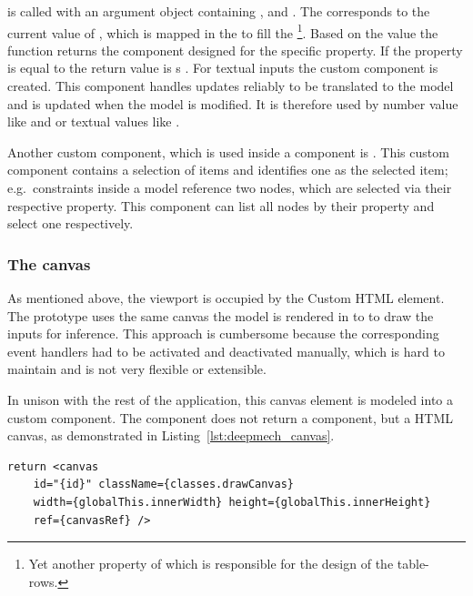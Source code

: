  is called with an argument object containing ,  and .
The  corresponds to the current value of , which is mapped in the  to fill the \footnote{Yet another property of  which is responsible for the design of the table-rows.}.
Based on the  value the  function returns the component designed for the specific property.
If the property is equal to  the return value is s .
For textual inputs the custom component  is created.
This component handles updates reliably to be translated to the  model and is updated when the  model is modified.
It is therefore used by number value like  and  or textual values like .

Another custom component, which is used inside a  component is .
This custom component contains a selection of items and identifies one as the selected item; e.g.\ constraints inside a  model reference two nodes, which are selected via their respective  property.
This component can list all nodes by their  property and select one respectively.

\subsubsection{The canvas}

As mentioned above, the viewport is occupied by the  Custom HTML element.
The prototype uses the same canvas the model is rendered in to to draw the inputs for inference.
This approach is cumbersome because the corresponding event handlers had to be activated and deactivated manually, which is hard to maintain and is not very flexible or extensible.

In unison with the rest of the application, this canvas element is modeled into a custom component.
The  component does not return a  component, but a HTML canvas, as demonstrated in Listing~\ref{lst:deepmech_canvas}.

\begin{lstlisting}[label={lst:deepmech_canvas}, caption={Return of the \code{DeepmechCanvas} component.}]
return <canvas
    id="{id}" className={classes.drawCanvas}
    width={globalThis.innerWidth} height={globalThis.innerHeight}
    ref={canvasRef} />
\end{lstlisting}

